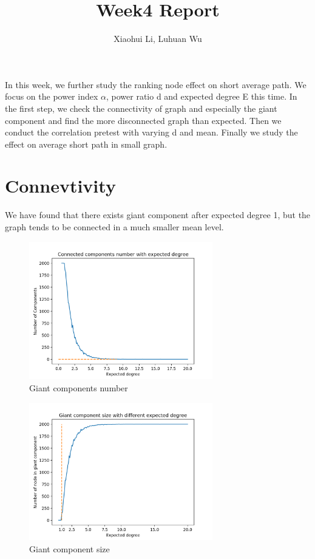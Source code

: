\documentclass[10pt,english]{article}\usepackage{graphicx, color}
\numberwithin{equation}{section}
\numberwithin{figure}{section}
\begin{document}
\title{Week4 Report}


\author{Xiaohui Li, Luhuan Wu}

\maketitle


In this week, we further study the ranking node effect on short average path. We focus on the power index $\alpha$, power ratio d and expected degree E this time. In the first step, we check the connectivity of graph and especially the giant component and find the more disconnected graph than expected. Then we conduct the correlation pretest with varying d and mean. Finally we study the effect on average short path in small graph. 

\section{Connevtivity}
We have found that there exists giant component after expected degree 1, but the graph tends to be connected in a much smaller mean level.
\begin{figure}[htbp]
\centering\includegraphics[width=8cm,height= 6cm]{CompoNum}
\caption{Giant components number}
\end{figure}

\begin{figure}[htbp]
\centering\includegraphics[width=8cm,height=6cm]{GiantCompo}
\caption{Giant component size}
\end{figure}
\quad\\
\quad\\
\end{document}
